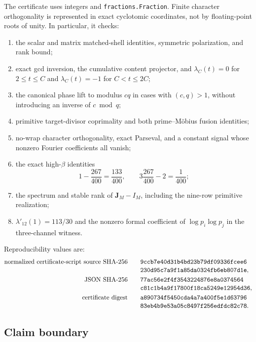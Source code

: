 The certificate uses integers and \texttt{fractions.Fraction}.  Finite
character orthogonality is represented in exact cyclotomic coordinates,
not by floating-point roots of unity.  In particular, it checks:
\begin{enumerate}[label=\textup{(\alph*)}]
 \item the scalar and matrix matched-shell identities, symmetric
 polarization, and rank bound;
 \item exact gcd inversion, the cumulative content projector, and
 \(\lambda_C(t)=0\) for \(2\le t\le C\) and
 \(\lambda_C(t)=-1\) for \(C<t\le2C\);
 \item the canonical phase lift to modulus \(cq\) in cases with
 \((c,q)>1\), without introducing an inverse of \(c\bmod q\);
 \item primitive target-divisor coprimality and both prime--M\"obius
 fusion identities;
 \item no-wrap character orthogonality, exact Parseval, and a constant
 signal whose nonzero Fourier coefficients all vanish;
 \item the exact high-\(\beta\) identities
 \[
  1-\frac{267}{400}=\frac{133}{400},\qquad
  3\frac{267}{400}-2=\frac1{400};
 \]
 \item the spectrum and stable rank of \(\mathbf J_M-I_M\), including the
 nine-row primitive realization;
 \item
 \(\lambda'_{12}(1)=113/30\) and the nonzero formal coefficient of
 \(\log p_i\log p_j\) in the three-channel witness.
\end{enumerate}

Reproducibility values are:
\begin{align}
 \text{normalized certificate-script source SHA-256}\qquad
 &\texttt{9ccb7e40d31b4bd23b79df09336fcee6}\notag\\[-0.2em]
 &\texttt{230d95c7a9f1a85da0324fb6eb807d1e},
 \label{eq:tpc32-source-hash}\\
 \text{JSON SHA-256}\qquad
 &\texttt{77ac56e2f4f3543224876e8a0374564}\notag\\[-0.2em]
 &\texttt{c81c1b4a9f17800f18ca5249e12954d36},
 \label{eq:tpc32-json-hash}\\
 \text{certificate digest}\qquad
 &\texttt{a890734f5450cda4a7a400f5e1d63796}\notag\\[-0.2em]
 &\texttt{83eb4b9e53a05c8497f256edfdc82c78}.
 \label{eq:tpc32-certificate-digest}
\end{align}

\subsection{Claim boundary}

